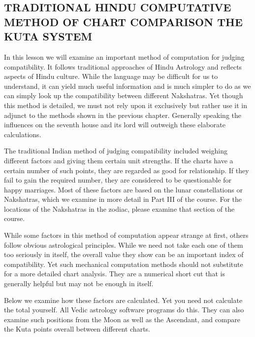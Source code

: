 \subsection{TRADITIONAL HINDU COMPUTATIVE METHOD OF CHART COMPARISON
THE KUTA SYSTEM}
 

In this lesson we will examine an important method of computation for judging compatibility. It follows traditional approaches of Hindu Astrology and reflects aspects of Hindu culture. While the language may be difficult for us to understand, it can yield much useful information and is much simpler to do as we can simply look up the compatibility between different Nakshatras. Yet though this method is detailed, we must not rely upon it exclusively but rather use it in adjunct to the methods shown in the previous chapter. Generally speaking the influences on the seventh house and its lord will outweigh these elaborate calculations.

 

The traditional Indian method of judging compatibility included weighing different factors and giving them certain unit strengths. If the charts have a certain number of such points, they are regarded as good for relationship. If they fail to gain the required number, they are considered to be questionable for happy marriages. Most of these factors are based on the lunar constellations or Nakshatras, which we examine in more detail in Part III of the course. For the locations of the Nakshatras in the zodiac, please examine that section of the course.

 

While some factors in this method of computation appear strange at first, others follow obvious astrological principles. While we need not take each one of them too seriously in itself, the overall value they show can be an important index of compatibility. Yet such mechanical computation methods should not substitute for a more detailed chart analysis. They are a numerical short cut that is generally helpful but may not be enough in itself.

 

Below we examine how these factors are calculated. Yet you need not calculate the total yourself. All Vedic astrology software programs do this. They can also examine such positions from the Moon as well as the Ascendant, and compare the Kuta points overall between different charts.

 

